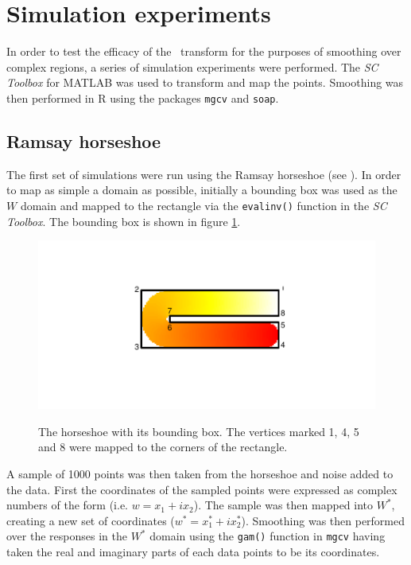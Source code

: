 \section{Simulation experiments}
\label{sc-sims}

In order to test the efficacy of the \sch\ transform for the purposes of smoothing over complex regions, a series of simulation experiments were performed. The \emph{SC Toolbox} for MATLAB was used to transform and map the points. Smoothing was then performed in \textsf{R} using the packages \texttt{mgcv} and \texttt{soap}.

\subsection{Ramsay horseshoe}

The first set of simulations were run using the Ramsay horseshoe (see ). In order to map as simple a domain as possible, initially a bounding box was used as the $W$ domain and mapped  to the rectangle via the \texttt{evalinv()} function in the \emph{SC Toolbox}. The bounding box is shown in figure \ref{hswithboundingbox}.

\begin{figure}
\centering
\includegraphics[trim=0.5in 1in 0in 0.5in]{sc/figs/hswithboundingbox.pdf} \\
\caption{The horseshoe with its bounding box. The vertices marked 1, 4, 5 and 8 were mapped to the corners of the rectangle.}
\label{hswithboundingbox}
\end{figure}

A sample of 1000 points was then taken from the horseshoe and noise added to the data. First the coordinates of the sampled points were expressed as complex numbers of the form (i.e. $w=x_1+ix_2$). The sample was then mapped into $W^*$, creating a new set of coordinates ($w^*=x_1^*+ix_2^*$). Smoothing was then performed over the responses in the $W^*$ domain using the \texttt{gam()} function in \texttt{mgcv} having taken the real and imaginary parts of each data points to be its coordinates. 

